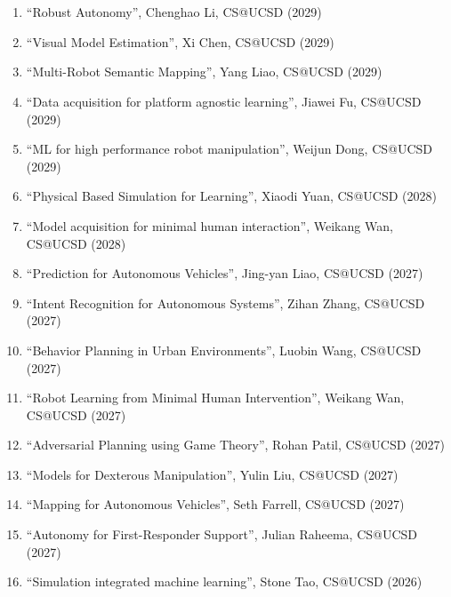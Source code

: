 \documentclass{article}
\begin{document}
\begin{cv}
\begin{cvlist}{~}
		\item[Ph.D supervision - Ongoing]\ \\
		\begin{enumerate}
			\item ``Robust Autonomy'', Chenghao Li, CS@UCSD (2029)
      \item ``Visual Model Estimation'', Xi Chen, CS@UCSD (2029)
			\item ``Multi-Robot Semantic Mapping'', Yang Liao, CS@UCSD (2029)
			\item ``Data acquisition for platform agnostic learning'', Jiawei Fu, CS@UCSD (2029)
			\item ``ML for high performance robot manipulation'', Weijun Dong, CS@UCSD (2029)
			\item ``Physical Based Simulation for Learning'', Xiaodi Yuan, CS@UCSD (2028)
      \item ``Model acquisition for minimal human interaction'', Weikang Wan, CS@UCSD (2028) 
			\item ``Prediction for Autonomous Vehicles'', Jing-yan Liao, CS@UCSD (2027)
			\item ``Intent Recognition for Autonomous Systems'', Zihan Zhang, CS@UCSD (2027)
			\item ``Behavior Planning in Urban Environments'', Luobin Wang, CS@UCSD (2027)
			\item ``Robot Learning from Minimal Human Intervention'', Weikang Wan, CS@UCSD (2027)
			\item ``Adversarial Planning using Game Theory'', Rohan Patil, CS@UCSD (2027)
      \item ``Models for Dexterous Manipulation'', Yulin Liu, CS@UCSD (2027) 
			\item ``Mapping for Autonomous Vehicles'', Seth Farrell, CS@UCSD (2027)
			\item ``Autonomy for First-Responder Support'', Julian Raheema, CS@UCSD (2027)
			\item ``Simulation integrated machine learning'', Stone Tao, CS@UCSD (2026)
		\end{enumerate}


\end{cvlist}
\end{cv}
\end{document}
